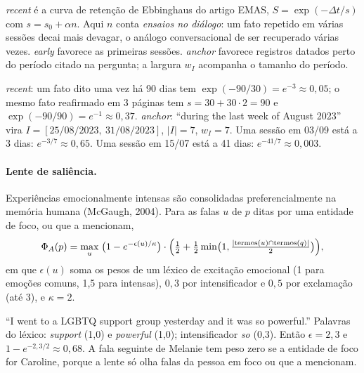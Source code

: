 \documentclass[11pt]{article}
\begin{document}
\begin{empalavras}
\emph{recent} é a curva de retenção de Ebbinghaus do artigo EMAS,
$S=\exp(-\Delta t/s)$ com $s=s_0+\alpha n$. Aqui $n$ conta \emph{ensaios no
diálogo}: um fato repetido em várias sessões decai mais devagar, o análogo
conversacional de ser recuperado várias vezes. \emph{early} favorece as
primeiras sessões. \emph{anchor} favorece registros datados perto do período
citado na pergunta; a largura $w_I$ acompanha o tamanho do período.
\end{empalavras}

\begin{exemplo}
\emph{recent}: um fato dito uma vez há 90 dias tem
$\exp(-90/30)=e^{-3}\approx0{,}05$; o mesmo fato reafirmado em 3 páginas tem
$s=30+30\cdot2=90$ e $\exp(-90/90)=e^{-1}\approx0{,}37$.
\emph{anchor}: ``during the last week of August 2023'' vira
$I=[25/08/2023,\ 31/08/2023]$, $|I|=7$, $w_I=7$. Uma sessão em 03/09 está a
3 dias: $e^{-3/7}\approx0{,}65$. Uma sessão em 15/07 está a 41 dias:
$e^{-41/7}\approx0{,}003$.
\end{exemplo}

\paragraph{Lente de saliência.}
Experiências emocionalmente intensas são consolidadas preferencialmente na
memória humana (McGaugh, 2004). Para as falas $u$ de $p$ ditas por uma
entidade de foco, ou que a mencionam,
\begin{equation}
  \Phi_A(p)=\max_{u}\;\bigl(1-e^{-\epsilon(u)/\kappa}\bigr)\cdot
  \Bigl(\tfrac12+\tfrac12\min\bigl(1,\tfrac{|\mathrm{termos}(u)\cap\mathrm{termos}(q)|}{2}\bigr)\Bigr),
  \label{eq:saliencia}
\end{equation}
em que $\epsilon(u)$ soma os pesos de um léxico de excitação emocional
(1 para emoções comuns, 1,5 para intensas), $0{,}3$ por intensificador e
$0{,}5$ por exclamação (até 3), e $\kappa=2$.

\begin{exemplo}
``I went to a LGBTQ support group yesterday and it was so powerful.'' Palavras
do léxico: \emph{support} (1,0) e \emph{powerful} (1,0); intensificador
\emph{so} (0,3). Então $\epsilon=2{,}3$ e $1-e^{-2{,}3/2}\approx0{,}68$. A
fala seguinte de Melanie tem peso zero se a entidade de foco for Caroline,
porque a lente só olha falas da pessoa em foco ou que a mencionam.
\end{exemplo}
\end{document}
